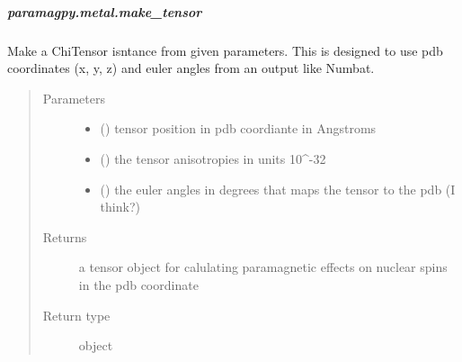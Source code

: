 \documentclass[a4paper,10pt,english]{sphinxmanual}
\begin{document}
\subparagraph{paramagpy.metal.make\_tensor}
\label{\detokenize{reference/generated/paramagpy.metal.make_tensor:paramagpy-metal-make-tensor}}\label{\detokenize{reference/generated/paramagpy.metal.make_tensor::doc}}

\begin{fulllineitems}
\label{\detokenize{reference/generated/paramagpy.metal.make_tensor:paramagpy.metal.make_tensor}}
Make a ChiTensor isntance from given parameters.
This is designed to use pdb coordinates (x, y, z) and euler angles
from an output like Numbat.
\begin{quote}\begin{description}
\item[{Parameters}] \leavevmode\begin{itemize}
\item {} 
\sphinxstyleliteralstrong{\sphinxupquote{, }} (\sphinxstyleliteralemphasis{\sphinxupquote{,}}) \textendash{} tensor position in pdb coordiante in Angstroms

\item {} 
 (\sphinxstyleliteralemphasis{\sphinxupquote{,}}) \textendash{} the tensor anisotropies in units 10\textasciicircum{}-32

\item {} 
\sphinxstyleliteralstrong{\sphinxupquote{, }} (\sphinxstyleliteralemphasis{\sphinxupquote{,}}) \textendash{} the euler angles in degrees that maps the tensor
to the pdb (I think?)

\end{itemize}

\item[{Returns}] \leavevmode
{} \textendash{} a tensor object for calulating paramagnetic effects on
nuclear spins in the pdb coordinate

\item[{Return type}] \leavevmode
object {\hyperref[\detokenize{reference/generated/paramagpy.metal.Metal:paramagpy.metal.Metal}]{}}

\end{description}\end{quote}

\end{fulllineitems}
\end{document}
